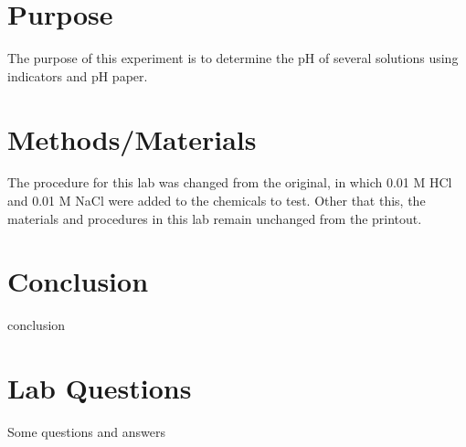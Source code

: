 \documentclass{article}
\begin{document}

\section{Purpose}

	The purpose of this experiment is to determine the pH of several solutions using indicators and pH paper.

\section{Methods/Materials}

	The procedure for this lab was changed from the original, in which 0.01 M HCl and 0.01 M NaCl were added to the chemicals to test. Other that this, the materials and procedures in this lab remain unchanged from the printout.

\section{Conclusion}

	conclusion

\newpage

\section{Lab Questions}

Some questions and answers
\end{document}
